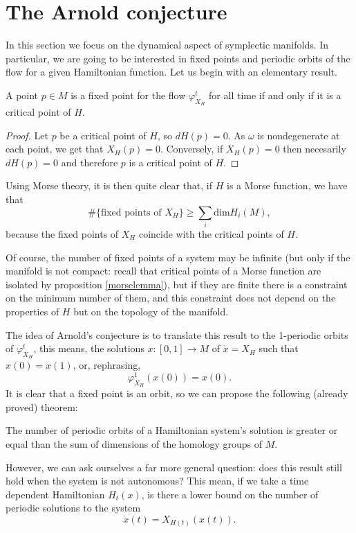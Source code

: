 \section{The Arnold conjecture}

In this section we focus on the dynamical aspect of symplectic manifolds. In particular, we are going to be interested in fixed points and periodic orbits of the flow for a given Hamiltonian function. Let us begin with an elementary result.

\begin{prop}
A point $p \in M$ is a fixed point for the flow $\varphi_{X_H}^t$ for all time if and only if it is a critical point of $H$.
\end{prop}

\begin{proof}
Let $p$ be a critical point of $H$, so $d H(p) = 0$. As $\omega$ is nondegenerate at each point, we get that $X_H(p) = 0$. Conversely, if $X_H(p) = 0$ then necesarily $d H(p) = 0$ and therefore $p$ is a critical point of $H$.
\end{proof}

Using Morse theory, it is then quite clear that, if $H$ is a Morse function, we have that
\[\# \{\text{fixed points of } X_H\} \geq \sum_i \text{dim}H_i(M) ,\]
because the fixed points of $X_H$ coincide with the critical points of $H$.

Of course, the number of fixed points of a system may be infinite (but only if the manifold is not compact: recall that critical points of a Morse function are isolated by proposition \ref{morselemma}), but if they are finite there is a constraint on the minimum number of them, and this constraint does not depend on the properties of $H$ but on the topology of the manifold.

The idea of Arnold's conjecture is to translate this result to the 1-periodic orbits of $\varphi_{X_H}^t$, this means, the solutions $x : [0,1] \rightarrow M$ of $\dot{x} = X_H$ such that $x(0) = x(1)$, or, rephrasing,
\[\varphi_{X_H}^1(x(0)) = x(0) .\]
It is clear that a fixed point is an orbit, so we can propose the following (already proved) theorem:

\begin{theo}
The number of periodic orbits of a Hamiltonian system's solution is greater or equal than the sum of dimensions of the homology groups of $M$.
\end{theo}

However, we can ask ourselves a far more general question: does this result still hold when the system is not autonomous? This mean, if we take a time dependent Hamiltonian $H_t(x)$, is there a lower bound on the number of periodic solutions to the system
\[\dot{x}(t) = X_{H(t)}(x(t)) .\]

